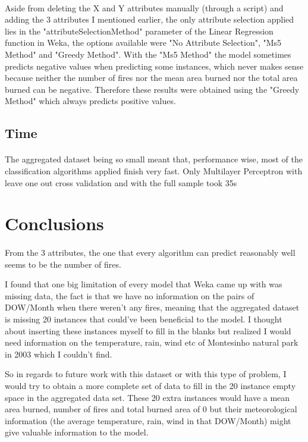 \documentclass[runningheads]{llncs}
\begin{document}
\paragraph{}

Aside from deleting the X and Y attributes manually (through a script) and adding the 3 attributes I mentioned earlier, the only attribute selection applied lies in the "attributeSelectionMethod" parameter of the Linear Regression function in Weka, the options available were "No Attribute Selection", "Ms5 Method" and "Greedy Method". 
With the "Ms5 Method" the model sometimes predicts negative values when predicting some instances, which never makes sense because neither the number of fires nor the mean area burned nor the total area burned can be negative. Therefore these results were obtained using the "Greedy Method" which always predicts positive values.

\subsection{Time}
\paragraph{}
The aggregated dataset being so small meant that, performance wise, most of the classification algorithms applied finish very fast. Only Multilayer Perceptron with leave one out cross validation and with the full sample took 35s


\section{Conclusions}
\paragraph{}
From the 3 attributes, the one that every algorithm can predict reasonably well seems to be the number of fires.


I found that one big limitation of every model that Weka came up with was missing data, the fact is that we have no information on the pairs of DOW/Month when there weren't any fires, meaning that the aggregated dataset is missing 20 instances that could've been beneficial to the model. I thought about inserting these instances myself to fill in the blanks but realized I would need information on the temperature, rain, wind etc of Montesinho natural park in 2003 which I couldn't find. 

So in regards to future work with this dataset or with this type of problem, I would try to obtain a more complete set of data to fill in the 20 instance empty space in the aggregated data set. These 20 extra instances would have a mean area burned, number of fires and total burned area of 0 but their meteorological information (the average temperature, rain, wind in that DOW/Month) might give valuable information to the model.



\printbibliography
\end{document}
